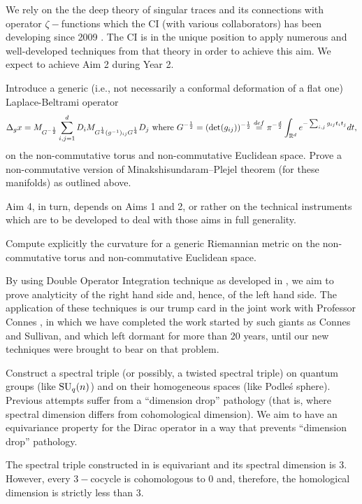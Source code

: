 \documentclass[12pt]{article}
\begin{document}
We rely on the the deep theory of singular traces and its connections with operator $\zeta-$functions which the CI (with various collaborators) has been developing since 2009 \cite{book,SUZ-indiana}. The CI is in the unique position to apply numerous and well-developed techniques from that theory in order to achieve this aim.  We expect to achieve Aim 2 during Year 2.

 Introduce a generic (i.e., not necessarily a conformal deformation of a flat one) Laplace-Beltrami operator
$$\Delta_g x=M_{G^{-\frac12}}\sum_{i,j=1}^dD_iM_{G^{\frac14}(g^{-1})_{ij}G^{\frac14}}D_j\mbox{ where }G^{-\frac12}=({\rm det}(g_{ij}))^{-\frac12}\stackrel{def}{=}\pi^{-\frac{d}{2}}\int_{\mathbb{R}^d}e^{-\sum_{i,j}g_{ij}t_it_j}dt,$$
on the non-commutative torus and non-commutative Euclidean space. Prove a non-commutative version of Minakshisundaram--Plejel theorem (for these manifolds) as outlined above.

Aim 4, in turn, depends on Aims 1 and 2, or rather on the technical instruments which are to be developed to deal with those aims in full generality.

 Compute explicitly the curvature for a generic Riemannian metric on the non-commutative torus and non-commutative Euclidean space.

By using Double Operator Integration technique as developed in \cite{PotapovSukochev}, we aim to prove analyticity of the right hand side and, hence, of the left hand side. The application of these techniques is our trump card in the joint work with Professor Connes \cite{Connes_team}, in which we have completed the work started by such giants as Connes and Sullivan, and which left dormant for more than 20 years, until our new techniques were brought to bear on that problem.

 Construct a spectral triple (or possibly, a twisted spectral triple) on quantum groups (like ${\rm SU}_q(n)$) and on their homogeneous spaces (like Podle\'s sphere). Previous attempts \cite{ChakrabortyPal} suffer from a ``dimension drop'' pathology (that is, where spectral dimension differs from cohomological dimension). We aim to have an equivariance property for the Dirac operator in a way that prevents ``dimension drop'' pathology. 

The spectral triple constructed in \cite{ChakrabortyPal} is equivariant and its spectral dimension is $3.$ However, every $3-$cocycle is cohomologous to $0$ and, therefore, the homological dimension is strictly less than $3.$ 
\end{document}
